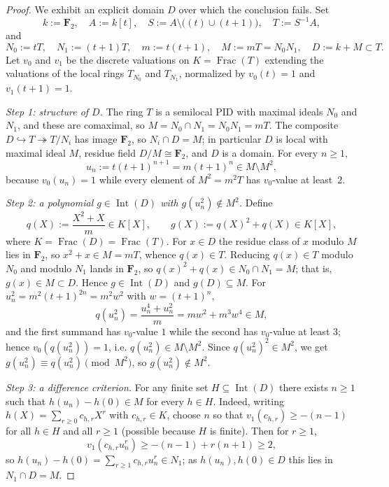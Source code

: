 \documentclass[11pt,reqno]{amsart}
\numberwithin{equation}{section}
\theoremstyle{definition}
\begin{document}
\begin{proof}
We exhibit an explicit domain $D$ over which the conclusion fails. Set
\[
   k:=\mathbf F_2,\quad A:=k[t],\quad S:=A\setminus\bigl((t)\cup(t+1)\bigr),
   \quad T:=S^{-1}A,
\]
and
\[
   N_0:=tT,\quad N_1:=(t+1)T,\quad m:=t(t+1),\quad M:=mT=N_0 N_1,\quad
   D:=k+M\subset T.
\]
Let $v_0$ and $v_1$ be the discrete valuations on $K=\operatorname{Frac}(T)$
extending the valuations of the local rings $T_{N_0}$ and $T_{N_1}$,
normalized by $v_0(t)=1$ and $v_1(t+1)=1$.

\smallskip
\noindent\emph{Step 1: structure of $D$.} The ring $T$ is a semilocal PID
with maximal ideals $N_0$ and $N_1$, and these are comaximal, so
$M=N_0\cap N_1=N_0 N_1=mT$. The composite $D\hookrightarrow T\twoheadrightarrow T/N_i$ has
image $\mathbf F_2$, so $N_i\cap D=M$; in particular $D$ is local with
maximal ideal $M$, residue field $D/M\cong\mathbf F_2$, and $D$ is a
domain. For every $n\ge 1$,
\[
   u_n:=t(t+1)^{n+1}=m(t+1)^n\in M\setminus M^2,
\]
because $v_0(u_n)=1$ while every element of $M^2=m^2 T$ has $v_0$-value
at least~$2$.

\smallskip
\noindent\emph{Step 2: a polynomial $g\in\operatorname{Int}(D)$ with
$g(u_n^2)\notin M^2$.} Define
\[
   q(X):=\frac{X^2+X}{m}\in K[X],\qquad
   g(X):=q(X)^2+q(X)\in K[X],
\]
where $K=\operatorname{Frac}(D)=\operatorname{Frac}(T)$. For $x\in D$ the
residue class of $x$ modulo $M$ lies in $\mathbf F_2$, so $x^2+x\in
M=mT$, whence $q(x)\in T$. Reducing $q(x)\in T$ modulo $N_0$ and
modulo $N_1$ lands in $\mathbf F_2$, so $q(x)^2+q(x)\in N_0\cap N_1=M$;
that is, $g(x)\in M\subset D$. Hence $g\in\operatorname{Int}(D)$ and
$g(D)\subseteq M$. For $u_n^2=m^2(t+1)^{2n}=m^2 w^2$ with $w=(t+1)^n$,
\[
   q(u_n^2)=\frac{u_n^4+u_n^2}{m}=m w^2+m^3 w^4\in M,
\]
and the first summand has $v_0$-value $1$ while the second has
$v_0$-value at least $3$; hence $v_0(q(u_n^2))=1$, i.e.
$q(u_n^2)\in M\setminus M^2$. Since $q(u_n^2)^2\in M^2$, we get
$g(u_n^2)\equiv q(u_n^2)\pmod{M^2}$, so $g(u_n^2)\notin M^2$.

\smallskip
\noindent\emph{Step 3: a difference criterion.} For any finite set
$H\subseteq\operatorname{Int}(D)$ there exists $n\ge 1$ such that
$h(u_n)-h(0)\in M$ for every $h\in H$. Indeed, writing
$h(X)=\sum_{r\ge 0} c_{h,r}X^r$ with $c_{h,r}\in K$, choose $n$ so that
$v_1(c_{h,r})\ge -(n-1)$ for all $h\in H$ and all $r\ge 1$ (possible
because $H$ is finite). Then for $r\ge 1$,
\[
   v_1(c_{h,r}u_n^r)\ge -(n-1)+r(n+1)\ge 2,
\]
so $h(u_n)-h(0)=\sum_{r\ge 1} c_{h,r} u_n^r\in N_1$; as
$h(u_n),h(0)\in D$ this lies in $N_1\cap D=M$.


\end{proof}
\end{document}
